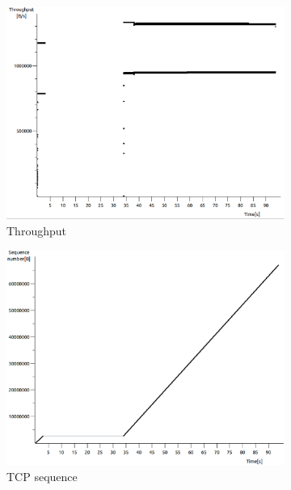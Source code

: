 \documentclass[conference,a4paper]{IEEEtran}
\begin{document}
\begin{figure}
 \centering
 \begin{subfigure}[b]{0.2\textwidth}
  \includegraphics[width=\textwidth]{s9-0_th}
  \caption{Throughput}
 \end{subfigure}
 \begin{subfigure}[b]{0.2\textwidth}
  \includegraphics[width=\textwidth]{s9-0_seq}
  \caption{TCP sequence}
 \end{subfigure}
 \begin{subfigure}[b]{0.2\textwidth}

\end{subfigure}
\end{figure}
\end{document}
